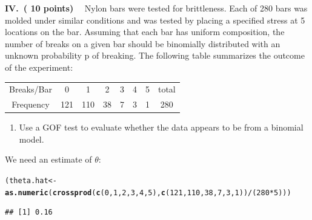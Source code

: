 \documentclass{article}\usepackage{graphicx, color}
\makeatletter
\newcommand{\hlfunctioncall}[1]{\textcolor[rgb]{0.501960784313725,0,0.329411764705882}{\textbf{#1}}}%
\newenvironment{kframe}{%
 \def\at@end@of@kframe{}%
 \ifinner\ifhmode%
  \def\at@end@of@kframe{\end{minipage}}%
  \begin{minipage}{\columnwidth}%
 \fi\fi%
 \def\FrameCommand##1{\hskip\@totalleftmargin \hskip-\fboxsep
 \colorbox{shadecolor}{##1}\hskip-\fboxsep
     \hskip-\linewidth \hskip-\@totalleftmargin \hskip\columnwidth}%
 \MakeFramed {\advance\hsize-\width
   \@totalleftmargin\z@ \linewidth\hsize
   \@setminipage}}%
 {\par\unskip\endMakeFramed%
 \at@end@of@kframe}
\newenvironment{knitrout}{}{} %
\def\vnn{\vskip0mm\noindent}
\makeatother
\begin{document}
\begin{enumerate}
\begin{enumerate}
\begin{shaded}
\end{shaded}
\end{enumerate}
\vnn\vnn
{\bf IV.\ ( 10 points) } \ \  Nylon bars were tested for brittleness. Each of 280
bars was molded under similar conditions and was tested by placing a specified
stress at 5 locations on the bar. Assuming
that each bar has uniform composition, the number of breaks on a given bar
should be binomially distributed with an unknown probability p of breaking.
The following table summarizes the outcome of the experiment:
\begin{center}
\begin{tabular}{|c|cccccc|c|} \hline
Breaks/Bar &  0   &   1 &  2 & 3 & 4 & 5 & total \\
Frequency  &  121 & 110 & 38 & 7 & 3 & 1 & 280   \\ \hline
\end{tabular}
\end{center}
\begin{enumerate}
\item[] Use a GOF test to evaluate whether the data appears to be from
a binomial model.
\end{enumerate}
\begin{shaded}
We need an estimate of $\theta$:
\begin{knitrout}
\color{fgcolor}\begin{kframe}
\begin{alltt}
(theta.hat <- \hlfunctioncall{as.numeric}(\hlfunctioncall{crossprod}(\hlfunctioncall{c}(0, 1, 2, 3, 4, 5), \hlfunctioncall{c}(121, 110, 38, 7, 3, 1))/(280 * 5)))
\end{alltt}
\begin{verbatim}
## [1] 0.16
\end{verbatim}
\end{kframe}
\end{knitrout}


\end{shaded}
\end{enumerate}
\end{document}
